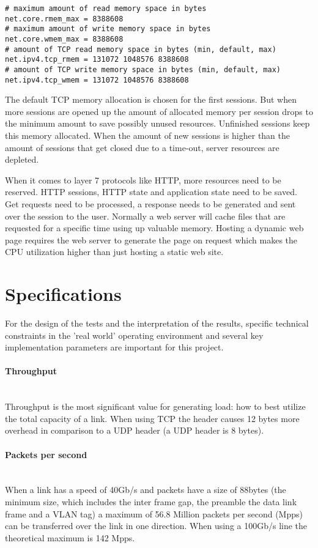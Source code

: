 \newpage

\begin{verbatim}
# maximum amount of read memory space in bytes
net.core.rmem_max = 8388608
# maximum amount of write memory space in bytes
net.core.wmem_max = 8388608
# amount of TCP read memory space in bytes (min, default, max)
net.ipv4.tcp_rmem = 131072 1048576 8388608
# amount of TCP write memory space in bytes (min, default, max)
net.ipv4.tcp_wmem = 131072 1048576 8388608
\end{verbatim}  

The default TCP memory allocation is chosen for the first sessions. But when more sessions are opened up the amount of allocated memory per session drops to the minimum amount to save possibly unused resources. 
Unfinished sessions keep this memory allocated. When the amount of new sessions is higher than the amount of sessions that get closed due to a time-out, server resources are depleted.

When it comes to layer 7 protocols like HTTP, more resources need to be reserved. HTTP sessions, HTTP state and application state need to be saved. Get requests need to be processed, a response needs to be generated and sent over the session to the user. Normally a web server will cache files that are requested for a specific time using up valuable memory. Hosting a dynamic web page requires the web server to generate the page on request which makes the CPU utilization higher than just hosting a static web site. 

\section{Specifications}\label{sec:specifications}
For the design of the tests and the interpretation of the results, specific technical constraints in the 'real world' operating environment and several key implementation parameters are important for this project.

\paragraph{Throughput}\label{par:throughput}\mbox{}\\
Throughput is the most significant value for generating load: how to best utilize the total capacity of a link. When using TCP the header causes 12 bytes more overhead in comparison to a UDP header (a UDP header is 8 bytes).

\paragraph{Packets per second}\label{par:pps}\mbox{}\\
When a link has a speed of 40Gb/s and packets have a size of 88bytes (the minimum size, which includes the inter frame gap, the preamble the data link frame and a VLAN tag) a maximum of 56.8 Million packets per second (Mpps) can be transferred over the link in one direction. When using a 100Gb/s line the theoretical maximum is 142 Mpps.   

